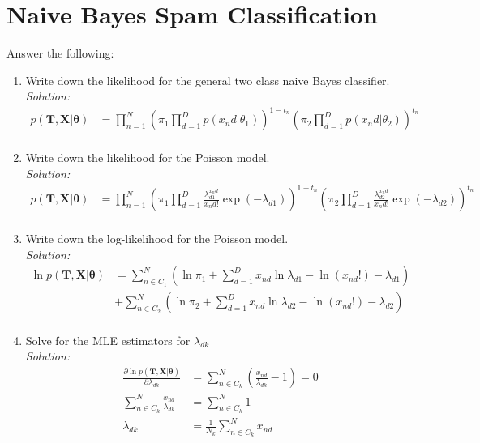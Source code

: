 \documentclass[12pt,a4paper]{article}
\begin{document}
	\section{Naive Bayes Spam Classification}
	Answer the following:
	\begin{enumerate}
		\item Write down the likelihood for the general two class naive Bayes classifier. \\
		\emph{Solution:} \\
		
		\begin{align*}
		p(\textbf{T},\textbf{X} | \boldsymbol{\theta}) &= \prod_{n=1}^{N}(\pi_1 \prod_{d=1}^{D}p(x_nd | \theta_1))^{1 - t_n} (\pi_2 \prod_{d=1}^{D}p(x_nd | \theta_2))^{t_n} \\
		\end{align*}		  
		
		\item Write down the likelihood for the Poisson model. \\
		\emph{Solution:} \\
		
		\begin{align*}
		p(\textbf{T},\textbf{X} | \boldsymbol{\theta}) &= \prod_{n=1}^{N}(\pi_1 \prod_{d=1}^{D}\frac{\lambda_{d1}^{x_nd}}{x_nd!}\exp(-\lambda_{d1}))^{1 - t_n} (\pi_2 \prod_{d=1}^{D}\frac{\lambda_{d2}^{x_nd}}{x_nd!}\exp(-\lambda_{d2}))^{t_n}\\
		\end{align*}
		
		\item Write down the log-likelihood for the Poisson model. \\
		\emph{Solution:} \\
		
		\begin{align*}
		\ln p(\textbf{T},\textbf{X} | \boldsymbol{\theta}) &= \sum_{n \in C_1}^{N}(\ln\pi_1 + \sum_{d = 1}^{D}x_{nd}\ln\lambda_{d1} - \ln(x_{nd}!) - \lambda_{d1}) \\
		&+ \sum_{n \in C_2}^{N}(\ln\pi_2 + \sum_{d=1}^{D} x_{nd}\ln\lambda_{d2} - \ln(x_{nd}!) - \lambda_{d2}) \\
		\end{align*}
		
		\item Solve for the MLE estimators for $\lambda_{dk}$ \\
		\emph{Solution:} \\
		
		\begin{align*}
		\frac{\partial \ln p(\textbf{T},\textbf{X} | \boldsymbol{\theta})}{\partial \lambda_{dk}} &= \sum_{n \in C_k}^{N}(\frac{x_{nd}}{\lambda_{dk}} - 1) = 0 \\
		\sum_{n \in C_k}^{N} \frac{x_{nd}}{\lambda_{dk}} &= \sum_{n \in C_k}^{N} 1 \\
		\lambda_{dk} &= \frac{1}{N_k} \sum_{n \in C_k}^{N} x_{nd}\\
		\end{align*}
		

\end{enumerate}
\end{document}
